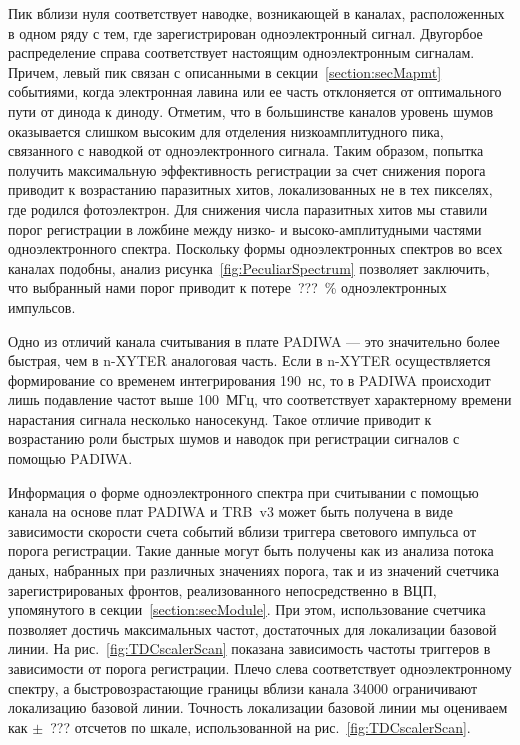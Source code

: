 Пик вблизи нуля соответствует наводке, возникающей в каналах, расположенных в одном ряду с тем, где зарегистрирован одноэлектронный сигнал. Двугорбое распределение справа соответствует настоящим одноэлектронным сигналам. Причем, левый пик связан с описанными в секции~\ref{section:secMapmt} событиями, когда электронная лавина или ее часть отклоняется от оптимального пути от динода к диноду. Отметим, что в большинстве каналов уровень шумов оказывается слишком высоким для отделения низкоамплитудного пика, связанного с наводкой от одноэлектронного сигнала. Таким образом, попытка получить максимальную эффективность регистрации за счет снижения порога приводит к возрастанию паразитных хитов, локализованных не в тех пикселях, где родился фотоэлектрон. Для снижения числа паразитных хитов мы ставили порог регистрации в ложбине между низко- и высоко-амплитудными частями одноэлектронного спектра. Поскольку формы одноэлектронных спектров во всех каналах подобны, анализ рисунка~\ref{fig:PeculiarSpectrum} позволяет заключить, что выбранный нами порог приводит к потере~???~\% одноэлектронных импульсов.

Одно из отличий канала считывания в плате PADIWA --- это значительно более быстрая, чем в n-XYTER аналоговая часть. Если в n-XYTER осуществляется формирование со временем интегрирования 190~нс, то в PADIWA происходит лишь подавление частот выше 100~МГц, что соответствует характерному времени нарастания сигнала несколько наносекунд. Такое отличие приводит к возрастанию роли быстрых шумов и наводок при регистрации сигналов с помощью PADIWA.

Информация о форме одноэлектронного спектра при считывании с помощью канала на основе плат PADIWA и TRB~v3 может быть получена в виде зависимости скорости счета событий вблизи триггера светового импульса от порога регистрации. Такие данные могут быть получены как из анализа потока даных, набранных при различных значениях порога, так и из значений счетчика зарегистрированых фронтов, реализованного непосредственно в ВЦП, упомянутого в секции~\ref{section:secModule}. При этом, использование счетчика позволяет достичь максимальных частот, достаточных для локализации базовой линии. На рис.~\ref{fig:TDCscalerScan} показана зависимость частоты триггеров в зависимости от порога регистрации. Плечо слева соответствует одноэлектронному спектру, а быстровозрастающие границы вблизи канала 34000 ограничивают локализацию базовой линии. Точность локализации базовой линии мы оцениваем как $ \pm $~??? отсчетов по шкале, использованной на рис.~\ref{fig:TDCscalerScan}.

